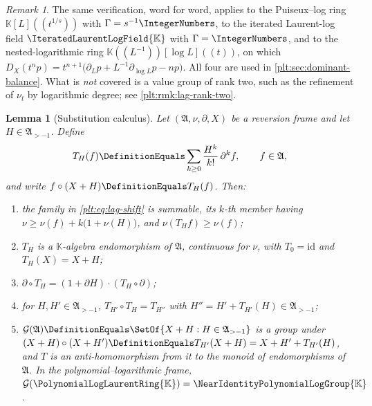 \documentclass[11pt,oneside]{article}
\theoremstyle{plain}
\newtheorem{lemma}[theorem]{Lemma}
\theoremstyle{definition}
\theoremstyle{remark}
\newtheorem{remark}[theorem]{Remark}
\newcommand{\K}{\mathbb{K}}
\newcommand{\PLlau}{\PolynomialLogLaurentRing{\K}}       %
\newcommand{\PLit}{\IteratedLaurentLogField{\K}}         %
\newcommand{\Gnear}{\NearIdentityPolynomialLogGroup{\K}} %
\newcommand{\ordt}{\nu_{t}}                              %
\newcommand{\DX}{D_{X}}                                  %
\newcommand{\compose}{\mathbin{\circ}}
\begin{document}
\begin{remark}
\label{plt:rmk:lag-other-frames}
The same verification, word for word, applies to the Puiseux--log ring
\(\K[L]((t^{1/s}))\) with \(\Gamma=s^{-1}\IntegerNumbers\), to the iterated
Laurent-log field \(\PLit\) with \(\Gamma=\IntegerNumbers\), and to the
nested-logarithmic ring \(\K((L^{-1}))[\log L]((t))\), on which
\(\DX(t^np)=t^{n+1}\bigl(\partial_Lp+L^{-1}\partial_{\log L}p-np\bigr)\).  All four
are used in \cref{plt:sec:dominant-balance}.  What is \emph{not} covered is a
value group of rank two, such as the refinement of \(\ordt\) by logarithmic
degree; see \cref{plt:rmk:lag-rank-two}.
\end{remark}

\begin{lemma}[Substitution calculus]
\label{plt:lem:lag-substitution}
Let \((\mathfrak A,\nu,\partial,X)\) be a reversion frame and let
\(H\in\mathfrak A_{>-1}\).  Define
\begin{equation}
\label{plt:eq:lag-shift}
  T_H(f)\DefinitionEquals\sum_{k\ge0}\frac{H^k}{k!}\,\partial^kf,
  \qquad f\in\mathfrak A,
\end{equation}
and write \(f\compose(X+H)\DefinitionEquals T_H(f)\).  Then:
\begin{enumerate}
\item the family in \cref{plt:eq:lag-shift} is summable, its \(k\)-th member
      having \(\nu\ge\nu(f)+k\bigl(1+\nu(H)\bigr)\), and \(\nu(T_Hf)\ge\nu(f)\);
\item \(T_H\) is a \(\K\)-algebra endomorphism of \(\mathfrak A\), continuous
      for \(\nu\), with \(T_0=\mathrm{id}\) and \(T_H(X)=X+H\);
\item \(\partial\compose T_H=(1+\partial H)\cdot(T_H\compose\partial)\);
\item for \(H,H'\in\mathfrak A_{>-1}\),
      \(T_{H'}\compose T_H=T_{H''}\) with \(H''=H'+T_{H'}(H)\in\mathfrak A_{>-1}\);
\item \(\mathcal G(\mathfrak A)\DefinitionEquals\SetOf{X+H:H\in\mathfrak A_{>-1}}\)
      is a group under
      \((X+H)\compose(X+H')\DefinitionEquals T_{H'}(X+H)=X+H'+T_{H'}(H)\),
      and \(T\) is an anti-homomorphism from it to the monoid of endomorphisms
      of \(\mathfrak A\).  In the polynomial--logarithmic frame,
      \(\mathcal G(\PLlau)=\Gnear\).
\end{enumerate}
\end{lemma}
\end{document}
